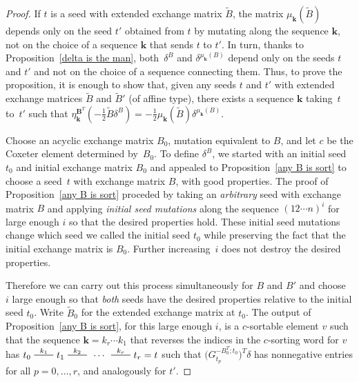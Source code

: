 \documentclass[10pt]{article}
\theoremstyle{definition}
\theoremstyle{remark}
\numberwithin{equation}{section}
\newcommand{\edge}{\,\,\rule[2.7pt]{20pt}{0.5pt}\,\,}
\newcommand{\0}{{\mathbf{0}}}
\newcommand{\kk}{{\boldsymbol{k}}}
\newcommand{\tB}{{\widetilde{B}}}
\newcommand{\BB}{\mathbf{B}}
\begin{document}
\begin{proof}%
If $t$ is a seed with extended exchange matrix $\tB$, the matrix $\mu_\kk(\tB)$ depends only on the seed $t'$ obtained from $t$ by mutating along the sequence $\kk$, not on the choice of a sequence $\kk$ that sends $t$ to $t'$.
In turn, thanks to Proposition~\ref{delta is the man}, both~$\delta^B$ and $\delta^{\mu_\kk(B)}$ depend only on the seeds $t$ and $t'$ and not on the choice of a sequence connecting them.
Thus, to prove the proposition, it is enough to show that, given any seeds $t$ and $t'$ with extended exchange matrices $\tB$ and $\tB'$ (of affine type), there exists a sequence $\kk$ taking~$t$ to~$t'$ such that $\eta^{\BB^T}_\kk(-\frac12\tB\delta^B)=-\frac12\mu_\kk(\tB)\delta^{\mu_\kk(B)}$.

Choose an acyclic exchange matrix $B_0$, mutation equivalent to $B$, and let $c$ be the Coxeter element determined by~$B_0$.
To define $\delta^B$, we started with an initial seed~$t_0$ and initial exchange matrix $B_0$ and appealed to Proposition~\ref{any B is sort} to choose a seed~$t$ with exchange matrix $B$, with good properties.
The proof of Proposition~\ref{any B is sort} proceded by taking an \emph{arbitrary} seed with exchange matrix $B$ and applying \emph{initial seed mutations} along the sequence $(12\cdots n)^i$ for large enough $i$ so that the desired properties hold. 
These initial seed mutations change which seed we called the initial seed $t_0$ while preserving the fact that the initial exchange matrix is $B_0$.
Further increasing~$i$ does not destroy the desired properties.

Therefore we can carry out this process simultaneously for $B$ and $B'$ and choose~$i$ large enough so that \emph{both} seeds have the desired properties relative to the initial seed $t_0$.
Write $\tB_0$ for the extended exchange matrix at $t_0$.
The output of Proposition~\ref{any B is sort}, for this large enough $i$, is a $c$-sortable element $v$ such that the sequence $\kk=k_r\cdots k_1$ that reverses the indices in the $c$-sorting word for $v$ has ${t_0\overset{k_1}{\edge}t_1\overset{k_2}{\edge}\,\cdots\,\overset{k_r}{\edge}t_r=t}$ such that $\bigl(G_{t_p}^{-B_0^T;t_0}\bigr)^T\delta$ has nonnegative entries for all ${p=0,\ldots,r}$, and analogously for $t'$.


\end{proof}
\end{document}
